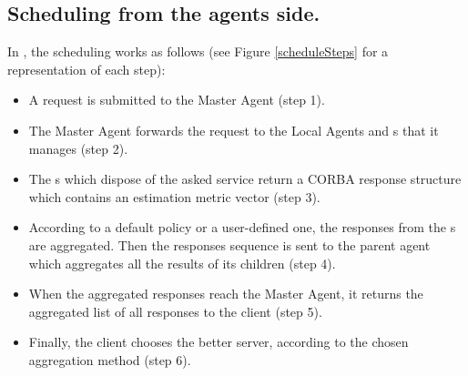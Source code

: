 \subsection{Scheduling from the agents side.}
In \diet, the scheduling works as follows (see Figure \ref{scheduleSteps} for
a representation of each step): 
\begin{itemize}
  \item A request is submitted to the Master Agent (step 1).
  \item The Master Agent forwards the request to the Local Agents and {\sed}s that
    it manages (step 2).
  \item The {\sed}s which dispose of the asked service return a CORBA response
    structure which contains an estimation metric vector (step 3).
  \item According to a default policy or a user-defined one, the responses
    from the {\sed}s are aggregated. Then the responses sequence is sent to
    the parent agent which aggregates all the results of its children (step 4).
  \item When the aggregated responses reach the Master Agent, it returns
    the aggregated list of all responses to the client (step 5).
  \item Finally, the client chooses the better server, according to the
    chosen aggregation method (step 6).
\end{itemize}
\newlength{\schdlFigWidth}
\setlength{\schdlFigWidth}{(\textwidth - 3mm) / 3}
